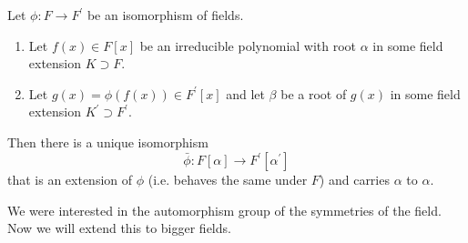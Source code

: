   \begin{theorem}
    Let $\phi: F \to F^\prime$ be an isomorphism of fields.
    \begin{enumerate}
      \item Let $f(x) \in F[x]$ be an irreducible polynomial with root $\alpha$ in some field extension $K \supset F$.
      \item Let $g(x) = \phi(f(x)) \in F^\prime[x]$ and let $\beta$ be a root of $g(x)$ in some field extension $K^\prime \supset F^\prime$. 
    \end{enumerate}
    Then there is a unique isomorphism  
    \begin{equation}
      \bar{\phi} : F[\alpha] \to F^\prime [\alpha^\prime]
    \end{equation}
    that is an extension of $\phi$ (i.e. behaves the same under $F$) and carries $\alpha$ to $\alpha$. 
  \end{theorem}

  We were interested in the automorphism group of the symmetries of the field. Now we will extend this to bigger fields. 

